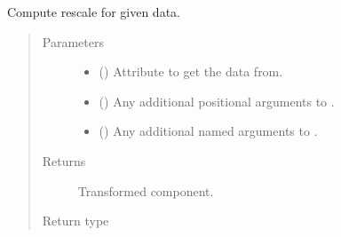 \documentclass[letterpaper,10pt,english]{sphinxmanual}
\begin{document}
\begin{fulllineitems}
\begin{fulllineitems}
\label{\detokenize{api/base_classes:geology.src.base_spatial.SpatialComponent.rescale}}
Compute rescale for given data.
\begin{quote}\begin{description}
\item[{Parameters}] \leavevmode\begin{itemize}
\item {} 
 (\sphinxstyleliteralemphasis{\sphinxupquote{, }}) \textendash{} Attribute to get the data from.

\item {} 
 () \textendash{} Any additional positional arguments to .

\item {} 
 () \textendash{} Any additional named arguments to .

\end{itemize}

\item[{Returns}] \leavevmode
{} \textendash{} Transformed component.

\item[{Return type}] \leavevmode
{\hyperref[\detokenize{api/base_classes:geology.src.base_spatial.SpatialComponent}]{}}

\end{description}\end{quote}

\end{fulllineitems}



\end{fulllineitems}
\end{document}
